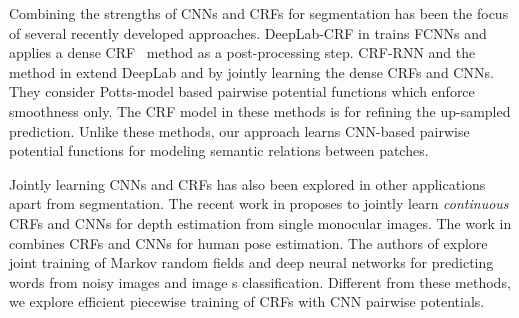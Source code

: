 Combining the strengths of CNNs and CRFs for segmentation
has been the focus of several recently developed approaches.
DeepLab-CRF in \cite{ChenPKMY14} trains FCNNs and applies a dense CRF~\cite{krahenbuhl2012efficient} method
as a post-processing step.
CRF-RNN \cite{zheng2015conditional} and the method in \cite{schwing2015fully} extend DeepLab and \cite{krahenbuhl2013parameter} by jointly learning the dense CRFs and CNNs.  They consider Potts-model based  pairwise potential functions which  enforce smoothness only.
The CRF model in these methods is for refining the up-sampled prediction.
Unlike  these methods, our approach learns CNN-based pairwise potential functions for modeling semantic relations between patches.



Jointly learning CNNs and CRFs has also been explored in other applications apart from segmentation.
The recent work in \cite{liu2014deep,liu2015learning} proposes to jointly learn {\em continuous} CRFs and CNNs for depth estimation
from  single monocular images. 
The work in \cite{Lecun_nips14} combines CRFs and CNNs for human pose estimation.
The authors of \cite{chen2014learning} explore joint training of Markov random fields and deep neural networks for predicting words from noisy images and image s classification. Different from these methods, we explore efficient piecewise training of CRFs with CNN pairwise potentials.


